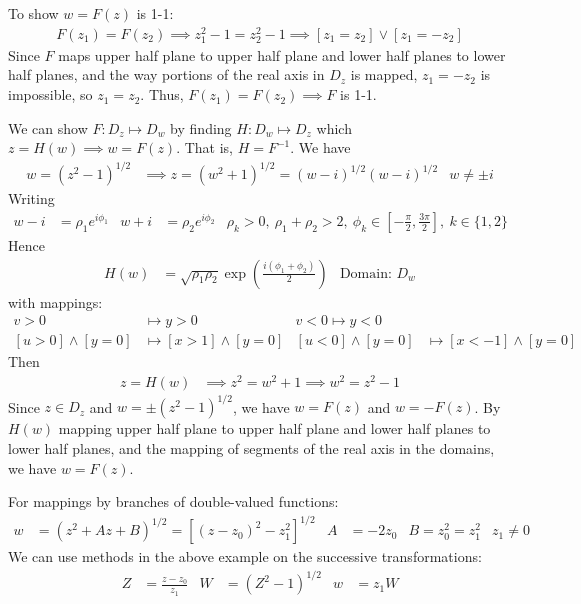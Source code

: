 \documentclass[12pt, english]{book}
\begin{document}
\begin{example}
		To show \(w = F(z)\) is 1-1:
		\begin{align*}
			F(z_1) = F(z_2) \implies z_1^2 - 1 = z_2^2 - 1 \implies [z_1 = z_2] \lor [z_1 = - z_2]
		\end{align*}
		Since \(F\) maps upper half plane to upper half plane and lower half planes to lower half planes, and the way portions of the real axis in \(D_z\) is mapped, \(z_1 = -z_2\) is impossible, so \(z_1 = z_2\). Thus, \(F(z_1) = F(z_2) \implies F\) is 1-1.
		
		We can show \(F: D_z \mapsto D_w\) by finding \(H: D_w \mapsto D_z\) which \(z = H(w) \implies w = F(z)\). That is, \(H = F^{-1}\). We have
		\begin{align*}
			w = (z^2 - 1)^{1/2} &\implies z = (w^2 + 1)^{1/2} = (w - i)^{1/2} (w-i)^{1/2}
				& w \neq \pm i
		\end{align*}
		Writing 
		\begin{align*}
			w - i &= \rho_1 e^{i\phi_1} & w + i &= \rho_2 e^{i\phi_2} &
				\rho_k > 0, \ \rho_1 + \rho_2 > 2, \ \phi_k \in \left[-\frac{\pi}{2}, \frac{3\pi}{2}\right], \ k \in \{1,2\}
		\end{align*}
		Hence
		\begin{align*}
			H(w) &= \sqrt{\rho_1 \rho_2} \exp(\frac{i(\phi_1 + \phi_2)}{2})	&
				\text{Domain: } D_w
		\end{align*}
		with mappings:
		\begin{align*}
			v > 0 &\mapsto y > 0 & v < 0 \mapsto y<0 \\
			[u>0] \land [y=0] &\mapsto [x>1] \land [y=0] & 
				[u<0] \land [y=0] &\mapsto [x< -1] \land [y=0] 
		\end{align*}
		Then 
		\begin{align*}
			z = H(w) 
			&\implies z^2 = w^2 + 1 \implies w^2 = z^2 -1
		\end{align*}
		Since \(z \in D_z\) and \(w = \pm (z^2 - 1)^{1/2}\), we have \(w = F(z)\) and \(w = -F(z)\). By \(H(w)\) mapping upper half plane to upper half plane and lower half planes to lower half planes, and the mapping of segments of the real axis in the domains, we have \(w = F(z)\).
	\end{example}
	
	For mappings by branches of double-valued functions:
	\begin{align*}
		w &= (z^2 + Az + B)^{1/2} = [(z-z_0)^2 - z_1^2]^{1/2} &
			A &= -2z_0 & B = z_0^2 = z_1^2 &
			z_1 \neq 0
	\end{align*}
	We can use methods in the above example on the successive transformations:
	\begin{align*}
		Z &= \frac{z-z_0}{z_1} &
		W &= (Z^2 - 1)^{1/2} &
		w &= z_1 W
	\end{align*}
	
\end{document}

